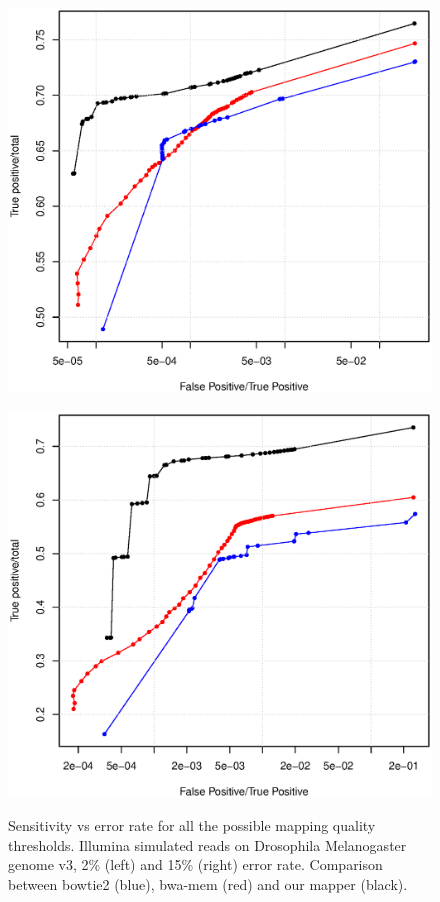 \begin{figure}[h]
	\begin{minipage}[b]{0.5\linewidth}
	  \centering
	  \includegraphics[width=\textwidth]{figures/chap4_dmel_2_15}
	  \label{fig:chap4:hg115}
   \end{minipage}
	\begin{minipage}[b]{0.5\linewidth}
	  \centering
	  \includegraphics[width=\textwidth]{figures/chap4_dmel_5_15}
	  \label{fig:chap4:hg215}
   \end{minipage}
   \caption{Sensitivity vs error rate for all the possible mapping
       quality thresholds. Illumina simulated reads on Drosophila
       Melanogaster genome v3, 2\% (left) and 15\% (right) error
       rate. Comparison between bowtie2 (blue), bwa-mem (red) and our
       mapper (black). } 

\end{figure}





